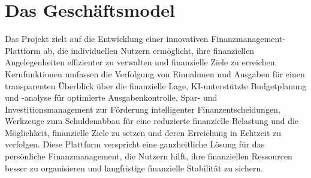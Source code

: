 \chapter{Das Geschäftsmodel}

Das Projekt zielt auf die Entwicklung einer innovativen Finanzmanagement-Plattform ab, 
die individuellen Nutzern ermöglicht, ihre finanziellen Angelegenheiten effizienter zu 
verwalten und finanzielle Ziele zu erreichen. Kernfunktionen umfassen die Verfolgung von 
Einnahmen und Ausgaben für einen transparenten Überblick über die finanzielle Lage, KI-unterstützte 
Budgetplanung und -analyse für optimierte Ausgabenkontrolle, Spar- und Investitionsmanagement zur
Förderung intelligenter Finanzentscheidungen, Werkzeuge zum Schuldenabbau für eine reduzierte finanzielle
Belastung und die Möglichkeit, finanzielle Ziele zu setzen und deren Erreichung in Echtzeit zu verfolgen. 
Diese Plattform verspricht eine ganzheitliche Lösung für das persönliche Finanzmanagement, die Nutzern hilft, 
ihre finanziellen Ressourcen besser zu organisieren und langfristige finanzielle Stabilität zu sichern.

